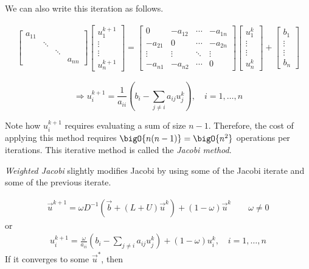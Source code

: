 We can also write this iteration as follows.

\begin{align*}
\begin{bmatrix}
  a_{11}& & &\\
  & \ddots&&\\
  && \ddots&\\
  && & a_{nn}
\end{bmatrix}
      \begin{bmatrix}
        u_1^{k+1}\\
        \vdots\\
        \vdots\\
        u_n^{k+1}
      \end{bmatrix}
  =
  \begin{bmatrix}
0 & -a_{12} & \cdots & -a_{1n}\\
-a_{21} & 0 & \cdots & -a_{2n}\\
\vdots & \vdots & \ddots & \vdots \\
-a_{n1} & -a_{n2} & \cdots & 0
  \end{bmatrix}
      \begin{bmatrix}
        u_1^{k}\\
        \vdots\\
        \vdots\\
        u_n^{k}
      \end{bmatrix}
  +
      \begin{bmatrix}
        b_1\\
        \vdots\\
        \vdots\\
        b_n
      \end{bmatrix}
\end{align*}

\begin{equation*}
  \Rightarrow u_i^{k+1} = \frac{1}{a_{ii}}\left( b_i - \sum_{j \neq i} a_{ij}u_j^k\right), \quad i=1,\ldots,n
\end{equation*}


Note how $u_i^{k+1}$ requires evaluating a sum of size $n-1$. Therefore, the
cost of applying this method requires $\bigO{n(n-1)} = \bigO{n^2}$ operations
per iterations. This iterative method is called the \emph{Jacobi method}.

\emph{Weighted Jacobi} slightly modifies Jacobi by using some of the Jacobi iterate and
some of the previous iterate.

\begin{align*}
\vec{u}^{k+1} = \omega D^{-1}\left(\vec{b}+(L +U)\vec{u}^k\right) + (1-\omega)\vec{u}^k \qquad \omega \neq 0
\end{align*}
or 
\begin{align*}
  u_i^{k+1} = \frac{\omega}{a_{ii}}\left( b_i - \sum_{j \neq i} a_{ij}u_j^k\right)+(1-\omega)u_i^k, \quad i=1,\ldots,n
\end{align*}
If it converges to some $\vec{u}^*$, then

